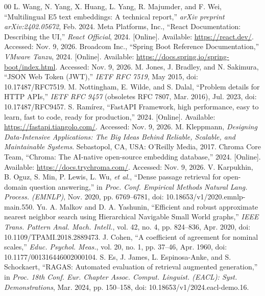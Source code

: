 \documentclass{IEEEtran}
\begin{document}
\begin{thebibliography}{00}
 L. Wang, N. Yang, X. Huang, L. Yang, R. Majumder, and F. Wei, ``Multilingual E5 text embeddings: A technical report,'' \textit{arXiv preprint arXiv:2402.05672}, Feb. 2024.
 Meta Platforms, Inc., ``React Documentation: Describing the UI,'' \textit{React Official}, 2024. [Online]. Available: \url{https://react.dev/}. Accessed: Nov. 9, 2026.
 Broadcom Inc., ``Spring Boot Reference Documentation,'' \textit{VMware Tanzu}, 2024. [Online]. Available: \url{https://docs.spring.io/spring-boot/index.html}. Accessed: Nov. 9, 2026.
 M. Jones, J. Bradley, and N. Sakimura, ``JSON Web Token (JWT),'' \textit{IETF RFC 7519}, May 2015, doi: 10.17487/RFC7519.
 M. Nottingham, E. Wilde, and S. Dalal, ``Problem details for HTTP APIs,'' \textit{IETF RFC 9457} (obsoletes RFC 7807, Mar. 2016), Jul. 2023, doi: 10.17487/RFC9457.
 S. Ramírez, ``FastAPI Framework, high performance, easy to learn, fast to code, ready for production,'' 2024. [Online]. Available: \url{https://fastapi.tiangolo.com/}. Accessed: Nov. 9, 2026.
 M. Kleppmann, \textit{Designing Data-Intensive Applications: The Big Ideas Behind Reliable, Scalable, and Maintainable Systems}. Sebastopol, CA, USA: O'Reilly Media, 2017.
 Chroma Core Team, ``Chroma: The AI-native open-source embedding database,'' 2024. [Online]. Available: \url{https://docs.trychroma.com/}. Accessed: Nov. 9, 2026.
 V. Karpukhin, B. Oguz, S. Min, P. Lewis, L. Wu, \textit{et al.}, ``Dense passage retrieval for open-domain question answering,'' in \textit{Proc. Conf. Empirical Methods Natural Lang. Process. (EMNLP)}, Nov. 2020, pp. 6769--6781, doi: 10.18653/v1/2020.emnlp-main.550.
 Yu. A. Malkov and D. A. Yashunin, ``Efficient and robust approximate nearest neighbor search using Hierarchical Navigable Small World graphs,'' \textit{IEEE Trans. Pattern Anal. Mach. Intell.}, vol. 42, no. 4, pp. 824--836, Apr. 2020, doi: 10.1109/TPAMI.2018.2889473.
 J. Cohen, ``A coefficient of agreement for nominal scales,'' \textit{Educ. Psychol. Meas.}, vol. 20, no. 1, pp. 37--46, Apr. 1960, doi: 10.1177/001316446002000104.
 S. Es, J. James, L. Espinosa-Anke, and S. Schockaert, ``RAGAS: Automated evaluation of retrieval augmented generation,'' in \textit{Proc. 18th Conf. Eur. Chapter Assoc. Comput. Linguist. (EACL): Syst. Demonstrations}, Mar. 2024, pp. 150--158, doi: 10.18653/v1/2024.eacl-demo.16.
\end{thebibliography}
\end{document}
